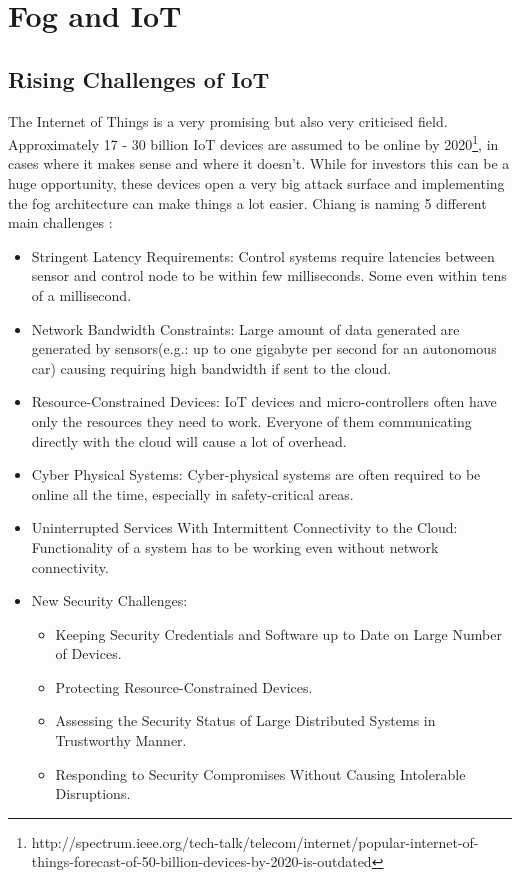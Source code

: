 \section{Fog and IoT}

\subsection{Rising Challenges of IoT}
The Internet of Things is a very promising but also very criticised field.
Approximately 17 - 30 billion IoT devices are assumed to be online by 2020\footnote{http://spectrum.ieee.org/tech-talk/telecom/internet/popular-internet-of-things-forecast-of-50-billion-devices-by-2020-is-outdated}, in cases where it makes sense and where it doesn't. While for investors this can be a huge opportunity, these devices open a very big attack surface and implementing the fog architecture can make things a lot easier. Chiang is naming 5 different main challenges \cite[s. 855 ff.]{DBLP:journals/iotj/ChiangZ16}:

\begin{itemize}
	\item [A] Stringent Latency Requirements: Control systems require latencies between sensor and control node to be within few milliseconds. Some even within tens of a millisecond.
	\item [B] Network Bandwidth Constraints: Large amount of data generated are generated by sensors(e.g.: up to one gigabyte per second for an autonomous car) causing requiring high bandwidth if sent to the cloud.
	\item [C] Resource-Constrained Devices: IoT devices and micro-controllers often have only the resources they need to work. Everyone of them communicating directly with the cloud will cause a lot of overhead.
	\item [D] Cyber Physical Systems: Cyber-physical systems are often required to be online all the time, especially in safety-critical areas.
	\item [E] Uninterrupted Services With Intermittent Connectivity to the Cloud: Functionality of a system has to be working even without network connectivity.
    \item [F] New Security Challenges:
	\begin{itemize}
		\item[1)] Keeping Security Credentials and Software up to Date on Large Number of Devices.
		\item[2)] Protecting Resource-Constrained Devices.
		\item[3)] Assessing the Security Status of Large Distributed Systems in Trustworthy Manner.
		\item[4)] Responding to Security Compromises Without Causing Intolerable Disruptions.
	\end{itemize}
\end{itemize}

